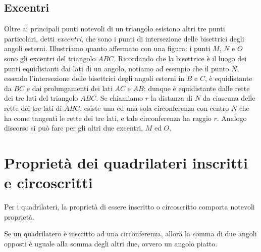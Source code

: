 \subsection{Excentri}

Oltre ai principali punti notevoli di un triangolo esistono altri tre 
punti particolari, detti \emph{excentri}, che sono i punti di 
intersezione delle bisettrici degli angoli esterni. Illustriamo 
quanto affermato con una figura: i punti $M$, $N$ e $O$ sono gli 
excentri del triangolo $ABC$. Ricordando che la bisettrice è il luogo 
dei punti equidistanti dai lati di un angolo, notiamo ad esempio che 
il punto $N$, essendo l'intersezione delle bisettrici degli angoli 
esterni in $B$ e $C$, è equidistante da $BC$ e dai prolungamenti dei 
lati $AC$ e $AB$: dunque è equidistante dalle rette dei tre lati del 
triangolo $ABC$. Se chiamiamo $r$ la distanza di $N$ da ciascuna delle 
rette dei tre lati di $ABC$, esiste una ed una sola circonferenza con 
centro $N$ che ha come tangenti le rette dei tre lati, e tale 
circonferenza ha raggio $r$. Analogo discorso si può fare per gli 
altri due excentri, $M$ ed $O$.


\begin{inaccessibleblock}
 \begin{figure}[htb]
	\centering
\end{figure}
\end{inaccessibleblock}


\section{Proprietà dei quadrilateri inscritti e 
circoscritti}\label{sect:quadrilateri_circonferenza}

Per i quadrilateri, la proprietà di essere inscritto o circoscritto 
comporta notevoli proprietà.

\begin{teorema}\label{teo:6.5}
Se un quadrilatero è inscritto ad una circonferenza, allora la somma 
di due angoli opposti è uguale alla somma degli altri due, ovvero un 
angolo piatto.
\end{teorema}


\begin{inaccessibleblock}
 \begin{figure}[htb]
	\centering
\end{figure}
\end{inaccessibleblock}

